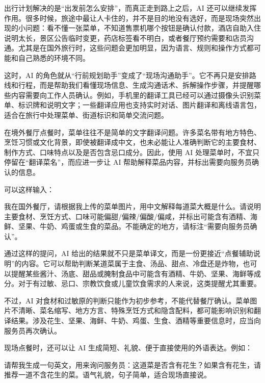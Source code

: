 出行计划解决的是“出发前怎么安排”，而真正走到路上之后，AI 还可以继续发挥作用。很多时候，旅途中最让人卡住的，并不是目的地没有选好，而是现场突然出现的小问题：看不懂一张菜单，不知道售票机哪个按钮是确认付款，酒店自助入住说明太长，景区公告临时变更，药店标签看不明白，或者餐厅预约需要和店员沟通。尤其是在国外旅行时，这些问题会更加明显，因为语言、规则和操作方式都可能和自己熟悉的环境不同。

这时，AI 的角色就从“行前规划助手”变成了“现场沟通助手”。它不再只是安排路线和行程，而是帮助我们看懂现场信息、生成沟通话术、拆解操作步骤，并提醒哪些内容需要向工作人员确认。例如，手机里的翻译工具已经可以通过摄像头识别菜单、标识牌和说明文字；一些翻译应用也支持实时对话、图片翻译和离线语言包，适合在旅行中处理菜单、街道标识和简单交流问题。


在境外餐厅点餐时，菜单往往不是简单的文字翻译问题。许多菜名带有地方特色、烹饪习惯或文化背景，即使被翻译成中文，也未必能让人准确判断它的主要食材、制作方式、口味特点以及是否包含忌口成分。因此，使用 AI 处理菜单时，不宜只停留在“翻译菜名”，而应进一步让 AI 帮助解释菜品内容，并标出需要向服务员确认的信息。

可以这样输入：

\begin{tcolorbox}[promptbox]
我在国外餐厅，请根据我上传的菜单图片，用中文解释每道菜大概是什么。请说明主要食材、烹饪方式、口味可能偏甜/偏辣/偏酸/偏咸，并标出可能含有酒精、海鲜、坚果、牛奶、鸡蛋或生食的菜品。不能确定的地方，请标注“需要向服务员确认”。
\end{tcolorbox}

通过这样的提问，AI 给出的结果就不只是菜单译文，而是一份更接近“点餐辅助说明”的内容。它可以帮助判断某道菜属于主食、汤品、甜点、冷盘还是炸物，也可以提醒某些酱汁、汤底、甜品或腌制食品中可能含有酒精、牛奶、坚果、海鲜等成分。对于有过敏、忌口、宗教饮食或儿童饮食需求的人来说，这类提醒尤其重要。

不过，AI 对食材和过敏原的判断只能作为初步参考，不能代替餐厅确认。菜单图片不清晰、菜名缩写、地方方言、特殊烹饪方式和隐含配料，都可能影响识别和翻译结果。涉及花生、坚果、海鲜、牛奶、鸡蛋、生食、酒精等重要信息时，应当向服务员再次确认。

现场点餐时，还可以让 AI 生成简短、礼貌、便于直接使用的外语表达。例如：

\begin{tcolorbox}[promptbox]
请帮我生成一句英文，用来询问服务员：这道菜是否含有花生？如果含有花生，请推荐一道不含花生的菜。语气礼貌，句子简单，适合现场直接说。
\end{tcolorbox}


